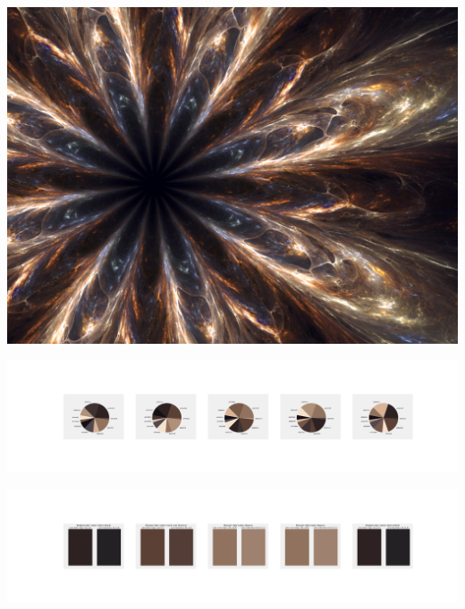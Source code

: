 \documentclass[11pt]{article}
\begin{document}
\begin{landscape}
    \begin{center}
    \includegraphics[width=\textwidth]{./nbimg/file (206).jpg}
    \end{center}

    \begin{center}
    \includegraphics[width=250mm]{./nbimg/pie-119.jpg}
    \end{center}

    \begin{center}
    \includegraphics[width=250mm]{./nbimg/peak-119.jpg}
    \end{center}
    


\end{landscape}
\end{document}
